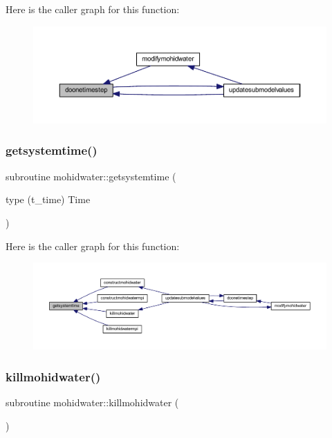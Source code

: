 Here is the caller graph for this function\+:\nopagebreak
\begin{figure}[H]
\begin{center}
\leavevmode
\includegraphics[width=350pt]{_main_8_f90_a5a877f32d8c35a58c7bd824a65b07dba_icgraph}
\end{center}
\end{figure}
\mbox{\label{_main_8_f90_a74bd4029918792f13597d8cba73a7faf}} 
\subsubsection{\texorpdfstring{getsystemtime()}{getsystemtime()}}
{\footnotesize\ttfamily subroutine mohidwater\+::getsystemtime (\begin{DoxyParamCaption}\item[{type (t\+\_\+time)}]{Time }\end{DoxyParamCaption})}

Here is the caller graph for this function\+:\nopagebreak
\begin{figure}[H]
\begin{center}
\leavevmode
\includegraphics[width=350pt]{_main_8_f90_a74bd4029918792f13597d8cba73a7faf_icgraph}
\end{center}
\end{figure}
\mbox{\label{_main_8_f90_a5128f2face71ee4677d8367d5cb5b14b}} 
\subsubsection{\texorpdfstring{killmohidwater()}{killmohidwater()}}
{\footnotesize\ttfamily subroutine mohidwater\+::killmohidwater (\begin{DoxyParamCaption}{ }\end{DoxyParamCaption})}

